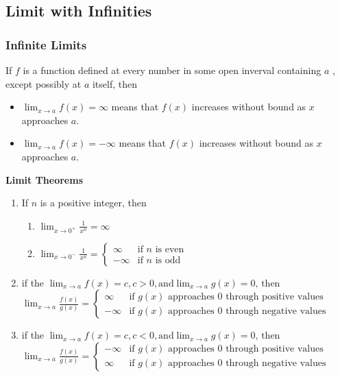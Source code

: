 \documentclass[11pt]{article}
\begin{document}
\subsection{Limit with Infinities}
\subsubsection{Infinite Limits}
If $f$ is a function defined at every number in some open inverval containing $a$
, except possibly at $a$ itself, then
\begin{itemize}
    \item $\displaystyle\lim_{x \to a} f(x) = \infty$ 
        means that $f(x)$ increases without bound as $x$
        approaches $a$.
    \item $\displaystyle\lim_{x \to a} f(x) = -\infty$ 
        means that $f(x)$ increases without bound as $x$
        approaches $a$.
    
\end{itemize}
\textbf{Limit Theorems}
\begin{enumerate}
    \item If $n$ is a positive integer, then
        \begin{enumerate}
            \item $
                \displaystyle 
                \lim_{x\to0^+}\frac{1}{x^n} = \infty
            $
            \item $
                \displaystyle 
                \lim_{x\to0^-}\frac{1}{x^n} =
                \begin{cases}
                    \infty &\text{if }n\text{ is even}\\
                    -\infty &\text{if }n\text{ is odd}
                \end{cases}
            $
        \end{enumerate}
    \item if the $\displaystyle
        \lim_{x\to a} f(x) =c, c>0, \text{and} \lim_{x\to a} g(x) =0
        \text{, then}$\\$
            \displaystyle\lim_{x\to a}\frac{f(x)}{g(x)}=
        \begin{cases}
            \infty &\text{if }g(x)\text{ approaches 0 through positive values}\\
            -\infty &\text{if }g(x)\text{ approaches 0 through negative values}
        \end{cases}$
    \item if the $\displaystyle
        \lim_{x\to a} f(x) =c, c<0, \text{and} \lim_{x\to a} g(x) =0
        \text{, then}$\\$
            \displaystyle\lim_{x\to a}\frac{f(x)}{g(x)}=
        \begin{cases}
            -\infty &\text{if }g(x)\text{ approaches 0 through positive values}\\
            \infty &\text{if }g(x)\text{ approaches 0 through negative values}
        \end{cases}$
\end{enumerate}
\end{document}

